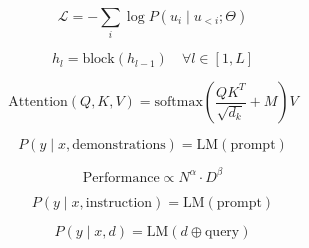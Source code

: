 
\begin{equation}
\mathcal{L} = -\sum_{i} \log P(u_i \mid u_{<i}; \Theta)
\end{equation}

\begin{equation}
h_l = \text{block}(h_{l-1}) \quad \forall l \in [1, L]
\end{equation}

\begin{equation}
\text{Attention}(Q, K, V) = \text{softmax}\left( \frac{QK^T}{\sqrt{d_k}} + M \right) V
\end{equation}

\begin{equation}
P(y \mid x, \text{demonstrations}) = \text{LM}(\text{prompt})
\end{equation}

\begin{equation}
\text{Performance} \propto N^{\alpha} \cdot D^{\beta}
\end{equation}

\begin{equation}
P(y \mid x, \text{instruction}) = \text{LM}(\text{prompt})
\end{equation}

\begin{equation}
P(y \mid x, d) = \text{LM}(d \oplus \text{query})
\end{equation}
